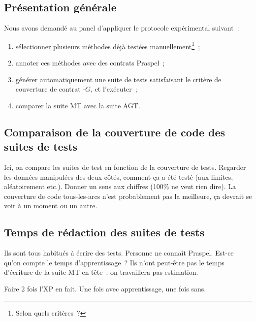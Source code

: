 \subsection{Présentation générale}

Nous avons demandé au panel d'appliquer le protocole expérimental suivant~:

\begin{enumerate}

\item sélectionner plusieurs méthodes déjà testées manuellement\footnote{Selon
quels critères~?}~;

\item annoter ces méthodes avec des contrats Praspel~;

\item générer automatiquement une suite de tests satisfaisant le critère de
couverture de contrat -$G$, et l'exécuter~;

\item comparer la suite MT avec la suite AGT.

\end{enumerate}


\subsection{Comparaison de la couverture de code des suites de tests}

Ici, on compare les suites de test en fonction de la couverture de tests.
Regarder les données manipulées des deux côtés, comment ça a été testé (aux
limites, aléatoirement etc.). Donner un sens aux chiffres (100\% ne veut rien
dire). La couverture de code tous-les-arcs n'est probablement pas la meilleure,
ça devrait se voir à un moment ou un autre.

\subsection{Temps de rédaction des suites de tests}

Ils sont tous habitués à écrire des tests. Personne ne connaît Praspel. Est-ce
qu'on compte le temps d'apprentissage~? Ils n'ont peut-être pas le temps
d'écriture de la suite MT en tête~: on travaillera pas estimation.

Faire 2 fois l'XP en fait. Une fois avec apprentissage, une fois sans.

